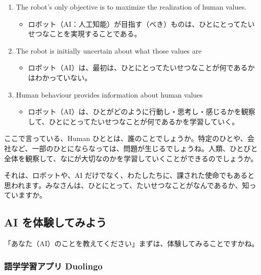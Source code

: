 \documentclass[
]{bxjsbook}
\providecommand{\tightlist}{%
  \setlength{\itemsep}{0pt}\setlength{\parskip}{0pt}}
\theoremstyle{definition}
\theoremstyle{definition}
\theoremstyle{definition}
\theoremstyle{definition}
\theoremstyle{remark}
\begin{document}
\begin{enumerate}
\def\labelenumi{\arabic{enumi}.}
\tightlist
\item
  The robot's only objective is to maximize the realization of human values.

  \begin{itemize}
  \tightlist
  \item
    ロボット（AI：人工知能）が目指す（べき）ものは、ひとにとってたいせつなことを実現することである。
  \end{itemize}
\item
  The robot is initially uncertain about what those values are

  \begin{itemize}
  \tightlist
  \item
    ロボット（AI）は、最初は、ひとにとってたいせつなことが何であるかはわかっていない。
  \end{itemize}
\item
  Human behaviour provides information about human values

  \begin{itemize}
  \tightlist
  \item
    ロボット（AI）は、ひとがどのように行動し・思考し・感じるかを観察して、ひとにとってたいせつなことが何であるかを学習していく。
  \end{itemize}
\end{enumerate}

ここで言っている、Human ひととは、誰のことでしょうか。特定のひとや、会社など、一部のひとにならなっては、問題が生じるでしょうね。人類、ひとびと全体を観察して、なにが大切なのかを学習していくことができるのでしょうか。

それは、ロボットや、AI だけでなく、わたしたちに、課された使命でもあると思われます。みなさんは、ひとにとって、たいせつなことがなんであるか、知っていますか。

\hypertarget{ai-ux3092ux4f53ux9a13ux3057ux3066ux307fux3088ux3046}{%
\subsection{AI を体験してみよう}\label{ai-ux3092ux4f53ux9a13ux3057ux3066ux307fux3088ux3046}}

「あなた（AI）のことを教えてください」まずは、体験してみることですかね。

\hypertarget{ux8a9eux5b66ux5b66ux7fd2ux30a2ux30d7ux30ea-duolingo}{%
\subsubsection{語学学習アプリ Duolingo}\label{ux8a9eux5b66ux5b66ux7fd2ux30a2ux30d7ux30ea-duolingo}}
\end{document}
